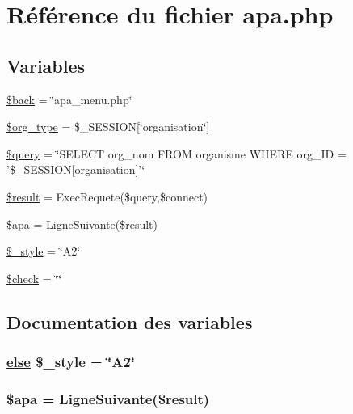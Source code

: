 \hypertarget{apa_8php}{
\section{R\'{e}f\'{e}rence du fichier apa.php}
\label{apa_8php}
}
\subsection*{Variables}
\begin{CompactItemize}
\item 
\hyperlink{apa_8php_a0}{\$back} = \char`\"{}apa\_\-menu.php\char`\"{}
\item 
\hyperlink{apa_8php_a1}{\$org\_\-type} = \$\_\-SESSION\mbox{[}\char`\"{}organisation\char`\"{}\mbox{]}
\item 
\hyperlink{apa_8php_a2}{\$query} = \char`\"{}SELECT org\_\-nom FROM organisme WHERE org\_\-ID = '\$\_\-SESSION\mbox{[}organisation\mbox{]}'\char`\"{}
\item 
\hyperlink{apa_8php_a3}{\$result} = Exec\-Requete(\$query,\$connect)
\item 
\hyperlink{apa_8php_a4}{\$apa} = Ligne\-Suivante(\$result)
\item 
\hyperlink{apa_8php_a5}{\$\_\-style} = \char`\"{}A2\char`\"{}
\item 
\hyperlink{apa_8php_a6}{\$check} = \char`\"{}\char`\"{}
\end{CompactItemize}


\subsection{Documentation des variables}
\hypertarget{apa_8php_a5}{
\subsubsection[\$\_\-style]{\setlength{\rightskip}{0pt plus 5cm}\hyperlink{cron_8php_a9}{else} \$\_\-style = \char`\"{}A2\char`\"{}}}
\label{apa_8php_a5}


\hypertarget{apa_8php_a4}{
\subsubsection[\$apa]{\setlength{\rightskip}{0pt plus 5cm}\$apa = Ligne\-Suivante(\$result)}}
\label{apa_8php_a4}


